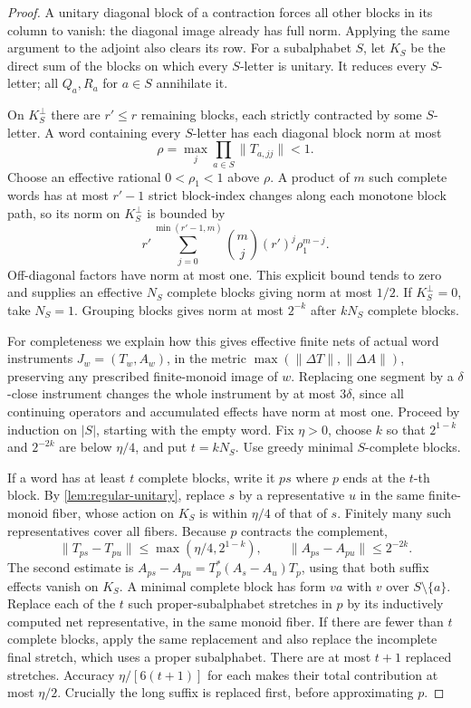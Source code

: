 \documentclass[11pt]{article}
\theoremstyle{plain}
\theoremstyle{definition}
\theoremstyle{remark}
\begin{document}
\begin{proof}
A unitary diagonal block of a contraction forces all other blocks in its column to vanish: the diagonal image already has full norm. Applying the same argument to the adjoint also clears its row. For a subalphabet $S$, let $K_S$ be the direct sum of the blocks on which every $S$-letter is unitary. It reduces every $S$-letter; all $Q_a,R_a$ for $a\in S$ annihilate it.

On $K_S^\perp$ there are $r'\le r$ remaining blocks, each strictly contracted by some $S$-letter. A word containing every $S$-letter has each diagonal block norm at most
\[
 \rho=\max_j\prod_{a\in S}\|T_{a,jj}\|<1.
\]
Choose an effective rational $0<\rho_1<1$ above $\rho$. A product of $m$ such complete words has at most $r'-1$ strict block-index changes along each monotone block path, so its norm on $K_S^\perp$ is bounded by
\begin{equation}\label{eq:block-bound}
 r'\sum_{j=0}^{\min(r'-1,m)}\binom mj(r')^j\rho_1^{m-j}.
\end{equation}
Off-diagonal factors have norm at most one. This explicit bound tends to zero and supplies an effective $N_S$ complete blocks giving norm at most $1/2$. If $K_S^\perp=0$, take $N_S=1$. Grouping blocks gives norm at most $2^{-k}$ after $kN_S$ complete blocks.

For completeness we explain how this gives effective finite nets of actual word instruments $J_w=(T_w,A_w)$, in the metric $\max(\|\Delta T\|,\|\Delta A\|)$, preserving any prescribed finite-monoid image of $w$. Replacing one segment by a $\delta$-close instrument changes the whole instrument by at most $3\delta$, since all continuing operators and accumulated effects have norm at most one. Proceed by induction on $|S|$, starting with the empty word. Fix $\eta>0$, choose $k$ so that $2^{1-k}$ and $2^{-2k}$ are below $\eta/4$, and put $t=kN_S$. Use greedy minimal $S$-complete blocks.

If a word has at least $t$ complete blocks, write it $ps$ where $p$ ends at the $t$-th block. By \cref{lem:regular-unitary}, replace $s$ by a representative $u$ in the same finite-monoid fiber, whose action on $K_S$ is within $\eta/4$ of that of $s$. Finitely many such representatives cover all fibers. Because $p$ contracts the complement,
\[
 \|T_{ps}-T_{pu}\|\le\max(\eta/4,2^{1-k}),\qquad
 \|A_{ps}-A_{pu}\|\le2^{-2k}.
\]
The second estimate is $A_{ps}-A_{pu}=T_p^*(A_s-A_u)T_p$, using that both suffix effects vanish on $K_S$. A minimal complete block has form $va$ with $v$ over $S\setminus\{a\}$. Replace each of the $t$ such proper-subalphabet stretches in $p$ by its inductively computed net representative, in the same monoid fiber. If there are fewer than $t$ complete blocks, apply the same replacement and also replace the incomplete final stretch, which uses a proper subalphabet. There are at most $t+1$ replaced stretches. Accuracy $\eta/[6(t+1)]$ for each makes their total contribution at most $\eta/2$. Crucially the long suffix is replaced first, before approximating $p$.


\end{proof}
\end{document}
